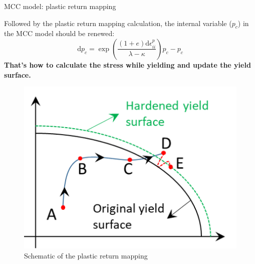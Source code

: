 \documentclass[aspectratio=169]{beamer}
\begin{document}
\begin{frame}{MCC model: plastic return mapping}
    \begin{minipage}{0.55\linewidth}
        Followed by the plastic return mapping calculation, the internal variable ($p_c$) in the MCC model should be renewed:
        \begin{equation}
            \mathrm{d}p_c = \exp{ \left (\frac{(1+e)\mathrm{d}\epsilon_{ii}^{p}}{\lambda-\kappa}\right)}p_c-p_c
            \label{eq: pc renewation in MCC model}
        \end{equation}
        \textbf{That's how to calculate the stress while yielding and update the yield surface.}
    \end{minipage}
    \hspace{2mm}
    \begin{minipage}{0.40\linewidth}
        \begin{figure}
            \centering
            \includegraphics[width=\linewidth]{./pic/plastic return mapping.png}
            \caption{Schematic of the plastic return mapping }
            \label{fig: plastic return mapping}
        \end{figure}
    \end{minipage}
\end{frame}
\end{document}

